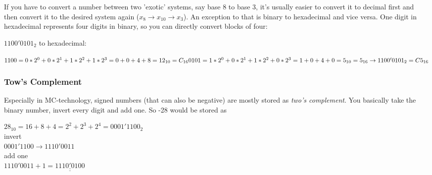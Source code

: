 \documentclass[a4paper, 11pt, nofootinbib]{article}
\begin{document}
\newpage

\noindent If you have to convert a number between two 'exotic' systems, say base 8 to base 3, it's usually easier to convert it to decimal first and then convert it to the desired system again ($x_{8} \rightarrow x_{10} \rightarrow x_{3}$). An exception to that is binary to hexadecimal and vice versa. One digit in hexadecimal represents four digits in binary, so you can directly convert blocks of four:

\noindent $1100'0101_{2}$ to hexadecimal:
\vspace{10px}

\noindent
$1100 = 0*2^0 + 0* 2^1 + 1*2^2 + 1*2^3 = 0 + 0 + 4 + 8 = 12_{10} = C_{16} \\
0101 = 1 * 2^0 + 0*2^1  + 1*2^2 + 0*2^3 = 1 + 0 + 4 + 0 = 5_{10} = 5_{16} \\
\rightarrow 1100'0101_{2} = C5_{16}
$

\subsubsection{Tow's Complement}
Especially in MC-technology, signed numbers (that can also be negative) are mostly stored as \textit{two's complement}. You basically take the binary number, invert every digit and add one. So -28 would be stored as
\vspace{10px}

\noindent
$ 28_{10} = 16 + 8 + 4 = 2^2 + 2^3 + 2^4 = 0001'1100_{2}$ \\
invert \\
$ 0001'1100 \rightarrow 1110'0011$\\
add one \\
$1110'0011 + 1 = \underline{\underline{1110'0100}}$
\end{document}
